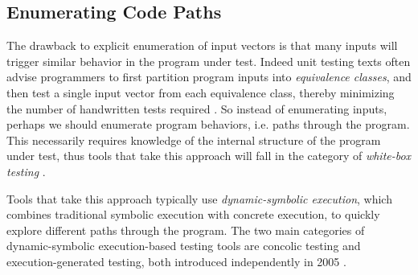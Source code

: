 \subsection{Enumerating Code Paths}
The drawback to explicit enumeration of input vectors is that many
inputs will trigger similar behavior in the program under test.
%
Indeed unit testing texts often advise programmers to first partition
program inputs into \emph{equivalence classes}, and then test a single
input vector from each equivalence class, thereby minimizing the number
of handwritten tests required \cite{burnstein_practical_2003}.
%
So instead of enumerating inputs, perhaps we should enumerate program
behaviors, i.e. paths through the program.
%
This necessarily requires knowledge of the internal structure of the
program under test, thus tools that take this approach will fall in the
category of \emph{white-box testing} \cite{adrion_validation_1982}.

Tools that take this approach typically use \emph{dynamic-symbolic
  execution}, which combines traditional symbolic execution with
concrete execution, to quickly explore different paths through the
program.
%
The two main categories of dynamic-symbolic execution-based testing
tools are concolic testing and execution-generated testing, both
introduced independently in 2005
\cite{Godefroid2005-am,cadar_execution_2005}.

